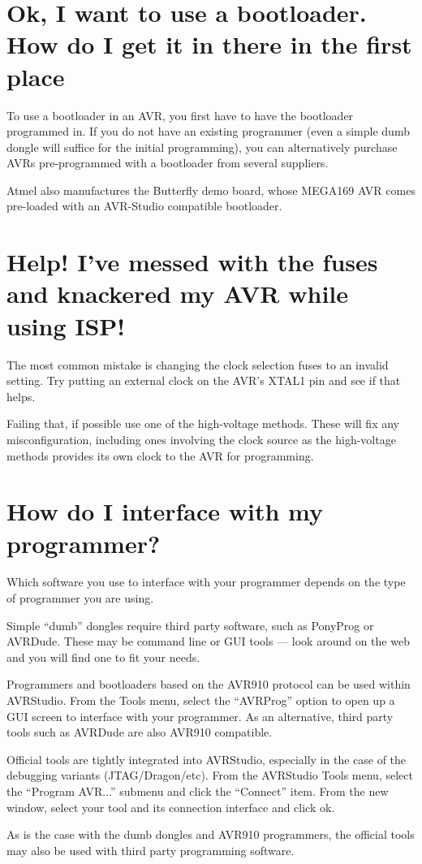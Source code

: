 \documentclass[a4paper,oneside,notitlepage]{book}
\begin{document}
\section{Ok, I want to use a bootloader. How do I get it in there in the first place\textinterrobang}
To use a bootloader in an AVR, you first have to have the bootloader programmed in. If you do not have an existing programmer (even a simple dumb dongle will suffice for the initial programming), you can alternatively purchase AVRs pre-programmed with a bootloader from several suppliers.

Atmel also manufactures the Butterfly demo board, whose MEGA169 AVR comes pre-loaded with an AVR-Studio compatible bootloader.

\section{Help! I've messed with the fuses and knackered my AVR while using ISP!}
The most common mistake is changing the clock selection fuses to an invalid setting. Try putting an external clock on the AVR's XTAL1 pin and see if that helps.

Failing that, if possible use one of the high-voltage methods. These will fix any misconfiguration, including ones involving the clock source as the high-voltage methods provides its own clock to the AVR for programming.

\section{How do I interface with my programmer?}
Which software you use to interface with your programmer depends on the type of programmer you are using.

Simple ``dumb'' dongles require third party software, such as PonyProg or AVRDude. These may be command line or GUI tools --- look around on the web and you will find one to fit your needs.

Programmers and bootloaders based on the AVR910 protocol can be used within AVRStudio. From the Tools menu, select the ``AVRProg'' option to open up a GUI screen to interface with your programmer. As an alternative, third party tools such as AVRDude are also AVR910 compatible.

Official tools are tightly integrated into AVRStudio, especially in the case of the debugging variants (JTAG/Dragon/etc). From the AVRStudio Tools menu, select the ``Program AVR...'' submenu and click the ``Connect'' item. From the new window, select your tool and its connection interface and click ok.

As is the case with the dumb dongles and AVR910 programmers, the official tools may also be used with third party programming software.
\end{document}
